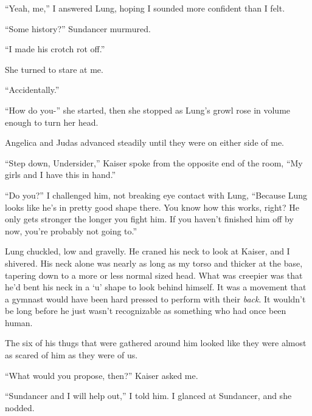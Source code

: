 





``Yeah, me,'' I answered Lung, hoping I sounded more confident than I felt.



``Some history?'' Sundancer murmured.



``I made his crotch rot off.''



She turned to stare at me.



``Accidentally.''



``How do you-'' she started, then she stopped as Lung's growl rose in volume enough to turn her head.



Angelica and Judas advanced steadily until they were on either side of me.



``Step down, Undersider,'' Kaiser spoke from the opposite end of the room, ``My girls and I have this in hand.''



``Do you?'' I challenged him, not breaking eye contact with Lung, ``Because Lung looks like he's in pretty good shape there.  You know how this works, right?  He only gets stronger the longer you fight him.  If you haven't finished him off by now, you're probably not going to.''



Lung chuckled, low and gravelly.  He craned his neck to look at Kaiser, and I shivered.  His neck alone was nearly as long as my torso and thicker at the base, tapering down to a more or less normal sized head.  What was creepier was that he'd bent his neck in a `u' shape to look behind himself.  It was a movement that a gymnast would have been hard pressed to perform with their \emph{back}.  It wouldn't be long before he just wasn't recognizable as something who had once been human.



The six of his thugs that were gathered around him looked like they were almost as scared of him as they were of us.



``What would you propose, then?'' Kaiser asked me.



``Sundancer and I will help out,'' I told him.  I glanced at Sundancer, and she nodded.



